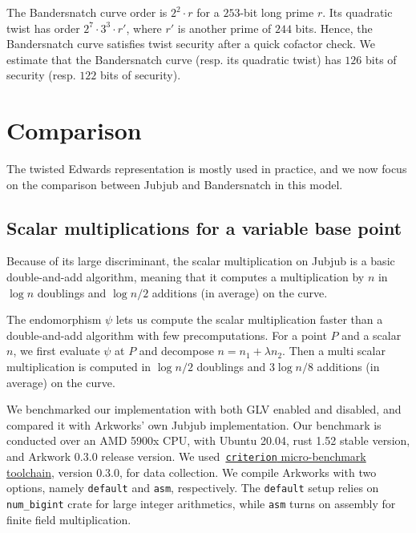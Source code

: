 \documentclass{article}
\newcommand{\ZZ}[1]{\color{cyan}#1\color{black}}
\theoremstyle{definition}
\begin{document}
The Bandersnatch curve order is $2^2\cdot r$ for a $253$-bit long
prime $r$.
Its quadratic twist has order
$2^7 \cdot 3^3 \cdot r'$, where $r'$ is another prime of $244$ bits.
Hence, the Bandersnatch curve satisfies twist security after a quick cofactor
check.
We estimate that the Bandersnatch curve (resp. its quadratic twist)
has $126$ bits of security (resp. $122$ bits of security).


\section{Comparison}\label{sec:comparison}

The twisted Edwards representation is mostly used in practice, and we
now focus on the comparison between Jubjub and Bandersnatch in this
model.

\subsection{Scalar multiplications for a variable base point}
Because of its large discriminant, the scalar multiplication on Jubjub
is a basic double-and-add algorithm, meaning that it computes a
multiplication by $n$ in $\log n$ doublings and $\log n/2$
additions (in average) on the curve. 

The endomorphism $\psi$ lets us compute the scalar multiplication
faster than a double-and-add algorithm with few precomputations. For a
point $P$ and a scalar $n$, we first evaluate $\psi$ at $P$ and
decompose $n = n_1 + \lambda n_2$. Then a multi scalar multiplication
is computed in $\log n/2$ doublings and $3\log n/8$ additions (in average) on the curve.

We benchmarked our implementation with both GLV enabled and disabled, and 
compared it with Arkworks' own Jubjub implementation. 
Our benchmark is conducted over an AMD 5900x CPU, with Ubuntu 20.04,
rust 1.52 stable version, and Arkwork 0.3.0 release version.
We used~\href{https://docs.rs/criterion}{\texttt{criterion}
  micro-benchmark toolchain},  version 0.3.0, for data collection. We
compile Arkworks with two options, namely \texttt{default} and
\texttt{asm}, respectively.
The \texttt{default} setup relies on \texttt{num\_bigint} crate for
large integer arithmetics, while \texttt{asm} turns on assembly for
finite field multiplication. 
\end{document}
